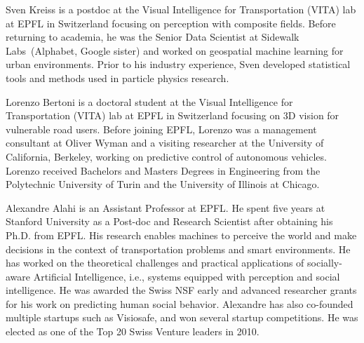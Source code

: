 \documentclass[journal]{IEEEtran}
\begin{document}
\ifCLASSOPTIONcaptionsoff
  \newpage
\fi

















\begin{IEEEbiography}{Sven Kreiss}
  is a postdoc at the Visual Intelligence for Transportation (VITA) lab
  at EPFL in Switzerland focusing on perception with composite fields.
  Before returning to academia, he was the Senior Data Scientist at Sidewalk
  Labs~(Alphabet, Google sister) and worked on geospatial machine learning
  for urban environments. Prior to his industry experience, Sven developed
  statistical tools and methods used in particle physics research.
\end{IEEEbiography}

\begin{IEEEbiography}{Lorenzo Bertoni}
  is a doctoral student at the Visual Intelligence for Transportation (VITA)
  lab at EPFL in Switzerland focusing on 3D vision for vulnerable road users.
  Before joining EPFL, Lorenzo was a management consultant at Oliver Wyman
  and a visiting researcher at the University of California, Berkeley,
  working on predictive control of autonomous vehicles. Lorenzo received
  Bachelors and Masters Degrees in Engineering from the Polytechnic
  University of Turin and the University of Illinois at Chicago.
\end{IEEEbiography}

\begin{IEEEbiography}{Alexandre Alahi}
  is an Assistant Professor at EPFL. He spent five years at Stanford
  University as a Post-doc and Research Scientist after obtaining his Ph.D.
  from EPFL. His research enables machines to perceive the world and make
  decisions in the context of transportation problems and smart environments.
  He has worked on the theoretical challenges and practical applications of
  socially-aware Artificial Intelligence, i.e., systems equipped with
  perception and social intelligence. He was awarded the Swiss NSF early and
  advanced researcher grants for his work on predicting human social
  behavior. Alexandre has also co-founded multiple startups such as
  Visiosafe, and won several startup competitions. He was elected as one of
  the Top 20 Swiss Venture leaders in 2010.
\end{IEEEbiography}



\vfill
\end{document}
